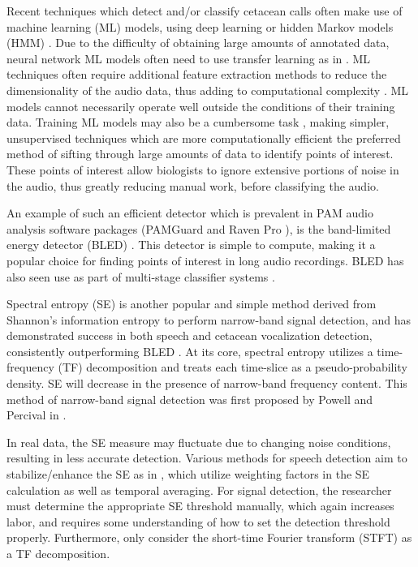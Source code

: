 Recent techniques which detect and/or classify cetacean calls often make use of machine learning (ML) models, 
using deep learning \citep{MLcnn, MLalexnet} or hidden Markov models (HMM) \citep{hmm1, hmm2}. 
Due to the difficulty of obtaining large amounts of annotated data, neural network ML models often 
need to use transfer learning as in \citep{MLalexnet}. ML techniques often require additional feature 
extraction methods to reduce the dimensionality of the audio data, thus adding to computational 
complexity \citep{hmm3}. ML models cannot necessarily operate well outside the conditions of their training data. 
Training ML models may also be a cumbersome task \citep{unsupervised}, making simpler, unsupervised techniques 
which are more computationally efficient the preferred method of sifting through large amounts of data to 
identify points of interest. These points of interest allow biologists to ignore extensive portions of noise in the 
audio, thus greatly reducing manual work, before classifying the audio.

An example of such an efficient detector which is prevalent in PAM audio analysis 
software packages (PAMGuard \citep{PAMGuard} and Raven Pro \citep{raven}), %
is the band-limited energy detector (BLED) \citep{internalsignaldetection}. 
This detector is simple to compute, making it a popular choice for finding 
points of interest in long audio recordings. BLED has also seen use as part of multi-stage classifier systems \citep{unsupervised}.

Spectral entropy (SE) is another popular and simple method derived from Shannon's 
information entropy \citep{shannon} to perform narrow-band signal detection, and has 
demonstrated success in both speech and cetacean vocalization detection, consistently 
outperforming BLED \citep{entropyJASA, entropyOCEANS, entropysubband}.  At its core, 
spectral entropy utilizes a time-frequency (TF) decomposition and treats each time-slice as a pseudo-probability density. 
SE will decrease in the presence of narrow-band frequency content. This method of narrow-band signal detection was first 
proposed by Powell and Percival in \citep{entropyorig}. 

In real data, the SE measure may fluctuate due to changing noise conditions, resulting in less accurate detection. Various methods for speech detection aim to stabilize/enhance the SE as in \citep{entropyOCEANS, entropysubband}, which utilize weighting factors in the SE calculation 
as well as temporal averaging. For signal detection, the researcher must 
determine the appropriate SE threshold manually, which again increases 
labor, and requires some understanding of how to set the detection threshold properly. Furthermore, \citep{entropyOCEANS, entropysubband} only consider the short-time Fourier transform (STFT) as a TF decomposition. 

